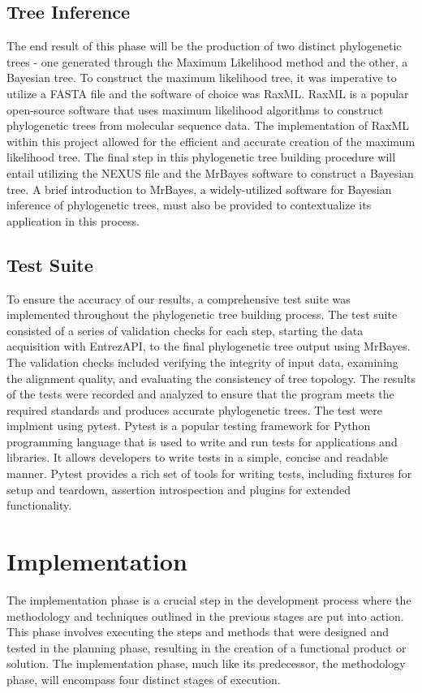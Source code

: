 \documentclass[12pt]{article}
\begin{document}
\subsection{Tree Inference}
The end result of this phase will be the production of two distinct phylogenetic trees - one generated through the Maximum Likelihood method and the other, a Bayesian tree.\newline
To construct the maximum likelihood tree, it was imperative to utilize a FASTA file and the software of choice was RaxML. RaxML is a popular open-source software that uses maximum likelihood algorithms to construct phylogenetic trees from molecular sequence data. The implementation of RaxML within this project allowed for the efficient and accurate creation of the maximum likelihood tree.\newline
The final step in this phylogenetic tree building procedure will entail utilizing the NEXUS file and the MrBayes software to construct a Bayesian tree. A brief introduction to MrBayes, a widely-utilized software for Bayesian inference of phylogenetic trees, must also be provided to contextualize its application in this process.

\subsection{Test Suite}
To ensure the accuracy of our results, a comprehensive test suite was implemented throughout the phylogenetic tree building process. The test suite consisted of a series of validation checks for each step, starting the data acquisition with EntrezAPI, to the final phylogenetic tree output using MrBayes. The validation checks included verifying the integrity of input data, examining the alignment quality, and evaluating the consistency of tree topology. The results of the tests were recorded and analyzed to ensure that the program meets the required standards and produces accurate phylogenetic trees. The test were implment using pytest. Pytest is a popular testing framework for Python programming language that is used to write and run tests for applications and libraries. It allows developers to write tests in a simple, concise and readable manner. Pytest provides a rich set of tools for writing tests, including fixtures for setup and teardown, assertion introspection and plugins for extended functionality.
\section{Implementation}\label{sec:desenvolvimentos}
The implementation phase is a crucial step in the development process where the methodology and techniques outlined in the previous stages are put into action. This phase involves executing the steps and methods that were designed and tested in the planning phase, resulting in the creation of a functional product or solution. The implementation phase, much like its predecessor, the methodology phase, will encompass four distinct stages of execution.
\end{document}

